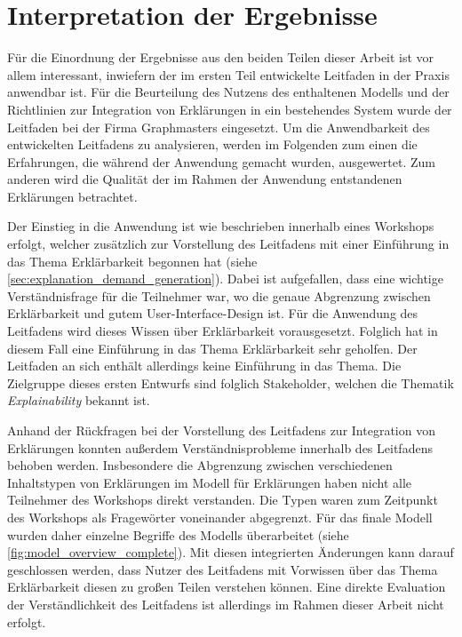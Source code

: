 \section{Interpretation der Ergebnisse}

Für die Einordnung der Ergebnisse aus den beiden Teilen dieser Arbeit ist vor allem interessant, inwiefern der im ersten Teil entwickelte Leitfaden in der Praxis anwendbar ist. Für die Beurteilung des Nutzens des enthaltenen Modells und der Richtlinien zur Integration von Erklärungen in ein bestehendes System wurde der Leitfaden bei der Firma Graphmasters eingesetzt. Um die Anwendbarkeit des entwickelten Leitfadens zu analysieren, werden im Folgenden zum einen die Erfahrungen, die während der Anwendung gemacht wurden, ausgewertet. Zum anderen wird die Qualität der im Rahmen der Anwendung entstandenen Erklärungen betrachtet.

Der Einstieg in die Anwendung ist wie beschrieben innerhalb eines Workshops erfolgt, welcher zusätzlich zur Vorstellung des Leitfadens mit einer Einführung in das Thema Erklärbarkeit begonnen hat (siehe \autoref{sec:explanation_demand_generation}). Dabei ist aufgefallen, dass eine wichtige Verständnisfrage für die Teilnehmer war, wo die genaue Abgrenzung zwischen Erklärbarkeit und gutem User-Interface-Design ist. Für die Anwendung des Leitfadens wird dieses Wissen über Erklärbarkeit vorausgesetzt. Folglich hat in diesem Fall eine Einführung in das Thema Erklärbarkeit sehr geholfen. Der Leitfaden an sich enthält allerdings keine Einführung in das Thema. Die Zielgruppe dieses ersten Entwurfs sind folglich Stakeholder, welchen die Thematik \textit{Explainability} bekannt ist.

Anhand der Rückfragen bei der Vorstellung des Leitfadens zur Integration von Erklärungen konnten außerdem Verständnisprobleme innerhalb des Leitfadens behoben werden. Insbesondere die Abgrenzung zwischen verschiedenen Inhaltstypen von Erklärungen im Modell für Erklärungen haben nicht alle Teilnehmer des Workshops direkt verstanden. Die Typen waren zum Zeitpunkt des Workshops als Fragewörter voneinander abgegrenzt. Für das finale Modell wurden daher einzelne Begriffe des Modells überarbeitet (siehe \autoref{fig:model_overview_complete}). Mit diesen integrierten Änderungen kann darauf geschlossen werden, dass Nutzer des Leitfadens mit Vorwissen über das Thema Erklärbarkeit diesen zu großen Teilen verstehen können. Eine direkte Evaluation der Verständlichkeit des Leitfadens ist allerdings im Rahmen dieser Arbeit nicht erfolgt.


